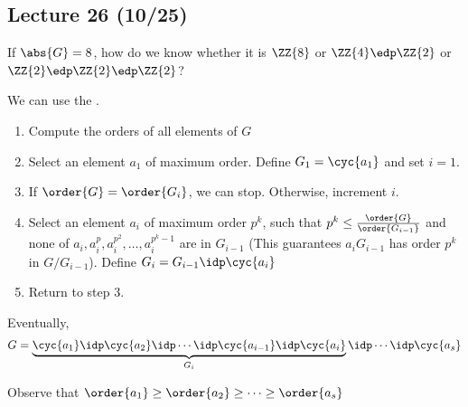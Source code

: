 \subsection*{Lecture 26 (10/25)} %

If \(\abs{G} = 8\), how do we know whether it is \(\ZZ{8}\) or \(\ZZ{4}\edp\ZZ{2}\) or \(\ZZ{2}\edp\ZZ{2}\edp\ZZ{2}\)?

We can use the .

\begin{enumerate}[label=Step \arabic*., left=0pt, labelsep=1em]
\item Compute the orders of all elements of \(G\)
\item Select an element \(a_1\) of maximum order. Define \(G_1=\cyc{a_1}\) and set \(i=1\).
\item If \(\order{G} = \order{G_i}\), we can stop. Otherwise, increment \(i\).
\item Select an element \(a_i\) of maximum order \(p^k\), such that \(p^k\leq \frac{\order{G}}{\order{G_{i-1}}}\) and none of \(a_i, a_i^p, a_i^{p^2}, \ldots, a_i^{p^k-1}\) are in \(G_{i-1}\) (This guarantees \(a_iG_{i-1}\) has order \(p^k\) in \(G/G_{i-1}\)). Define \(G_i = G_{i-1}\idp \cyc{a_i}\)
\item Return to step 3.
\end{enumerate}
Eventually, \begin{align*}
G=\underbrace{\cyc{a_1}\idp\cyc{a_2}\idp\cdots\idp\cyc{a_{i-1}}\idp\cyc{a_i}}_{G_i}\idp \cdots\idp\cyc{a_s}
\end{align*}
\begin{note}
Observe that \(\order{a_1}\geq \order{a_2}\geq \cdots \geq \order{a_s}\)
\end{note}

